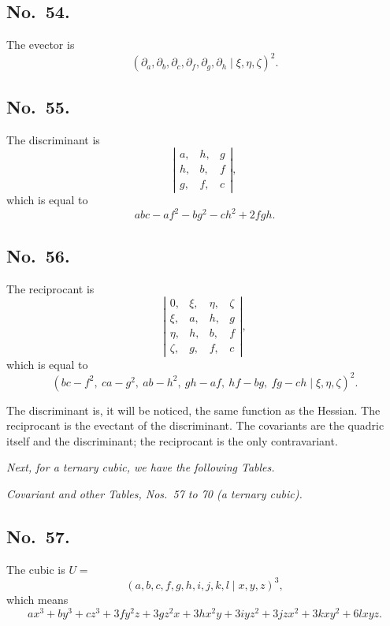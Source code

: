 \documentclass[11pt]{article}
\begin{document}
\subsection*{No.\ 54.}
The evector is
\[
(\partial_a, \partial_b, \partial_c, \partial_f, \partial_g, \partial_h \mid \xi, \eta, \zeta)^2.
\]

\subsection*{No.\ 55.}
The discriminant is
\[
\left|\begin{array}{ccc} a, & h, & g \\ h, & b, & f \\ g, & f, & c \end{array}\right|,
\]
which is equal to
\[
abc - af^2 - bg^2 - ch^2 + 2 fgh.
\]

\subsection*{No.\ 56.}
The reciprocant is
\[
\left|\begin{array}{cccc}
0,    & \xi, & \eta, & \zeta \\
\xi,  & a,   & h,    & g \\
\eta, & h,   & b,    & f \\
\zeta,& g,   & f,    & c
\end{array}\right|,
\]
which is equal to
\[
(bc - f^2,\ ca - g^2,\ ab - h^2,\ gh - af,\ hf - bg,\ fg - ch \mid \xi, \eta, \zeta)^2.
\]

The discriminant is, it will be noticed, the same function as the Hessian. The reciprocant is the evectant of the discriminant. The covariants are the quadric itself and the discriminant; the reciprocant is the only contravariant.

\bigskip

\noindent\textit{Next, for a ternary cubic, we have the following Tables.}

\medskip

\noindent\textit{Covariant and other Tables, Nos.\ 57 to 70 (a ternary cubic).}

\subsection*{No.\ 57.}
The cubic is $U =$
\[
(a, b, c, f, g, h, i, j, k, l \mid x, y, z)^3,
\]
which means
\[
a x^3 + b y^3 + c z^3 + 3 f y^2 z + 3 g z^2 x + 3 h x^2 y + 3 i y z^2 + 3 j z x^2 + 3 k x y^2 + 6 l x y z.
\]
\end{document}
